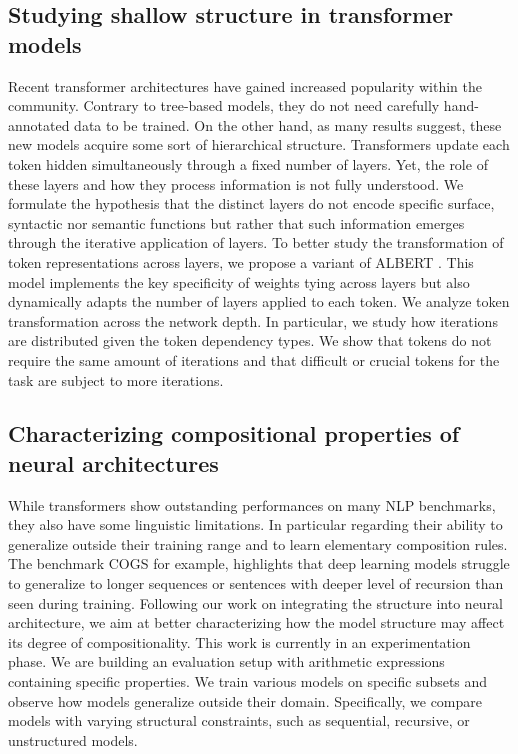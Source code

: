 \subsection{Studying shallow structure in transformer models}

Recent transformer architectures have gained increased popularity within the community. Contrary to tree-based models, they do not need carefully hand-annotated data to be trained. On the other hand, as many results suggest, these new models acquire some sort of hierarchical structure. Transformers update each token hidden simultaneously through a fixed number of layers. Yet, the role of these layers and how they process information is not fully understood. We formulate the hypothesis that the distinct layers do not encode specific surface, syntactic nor semantic functions but rather that such information emerges through the iterative application of layers. To better study the transformation of token representations across layers, we propose a variant of ALBERT \parencite{simoulin_2021b}. This model implements the key specificity of weights tying across layers but also dynamically adapts the number of layers applied to each token. We analyze token transformation across the network depth. In particular, we study how iterations are distributed given the token dependency types. We show that tokens do not require the same amount of iterations and that difficult or crucial tokens for the task are subject to more iterations.

\subsection{Characterizing compositional properties of neural architectures}

While transformers show outstanding performances on many NLP benchmarks, they also have some linguistic limitations. In particular regarding their ability to generalize outside their training range and to learn elementary composition rules. The benchmark COGS \parencite{kim_20} for example, highlights that deep learning models struggle to generalize to longer sequences or sentences with deeper level of recursion than seen during training. Following our work on integrating the structure into neural architecture, we aim at better characterizing how the model structure may affect its degree of compositionality. This work is currently in an experimentation phase. We are building an evaluation setup with arithmetic expressions containing specific properties. We train various models on specific subsets and observe how models generalize outside their domain. Specifically, we compare models with varying structural constraints, such as sequential, recursive, or unstructured models.


